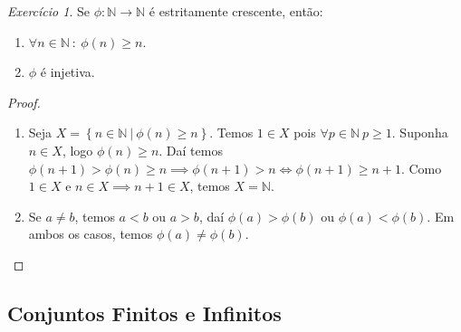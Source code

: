 \documentclass{article}
\theoremstyle{plain}
\theoremstyle{definition}
\theoremstyle{remark}
\newtheorem{exercicio}{Exercício}[subsection]
\begin{document}
\begin{exercicio}
	Se $\phi: \mathbb{N} \to \mathbb{N}$ é estritamente crescente, então:
	\begin{enumerate}[label=(\alph*)]
		\item $\forall n \in \mathbb{N} \: : \: \phi(n) \geq n$.
		\item $\phi$ é injetiva.
	\end{enumerate}
\end{exercicio}
\begin{proof}
	~\\
	\begin{enumerate}[label=(\alph*)]
		\item Seja $X = \left\{ n \in \mathbb{N} \: | \: \phi(n) \geq n \right\}$. Temos $1\in X$ pois $\forall p \in \mathbb{N} \: p\geq 1$. Suponha $n\in X$, logo $\phi(n) \geq n$. Daí temos $\phi(n+1) > \phi(n) \geq n \implies \phi(n+1) > n \iff \phi(n+1) \geq n+1$. Como $1\in X$ e $n\in X \implies n+1\in X$, temos $X = \mathbb{N}$.
		\item Se $a \neq b$, temos $a < b$ ou $a > b$, daí $\phi(a) > \phi(b)$ ou $\phi(a) < \phi(b)$. Em ambos os casos, temos  $\phi(a) \neq \phi(b)$.
	\end{enumerate}
\end{proof}
\subsection{Conjuntos Finitos e Infinitos}
\end{document}

